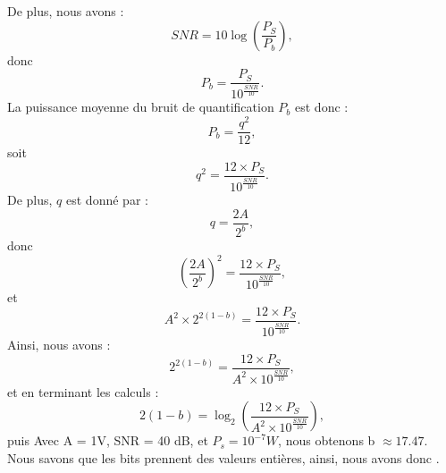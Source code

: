 De plus, nous avons :
\begin{equation}
SNR = 10 \log \left( \frac{P_S}{P_b} \right),
\end{equation}
donc
\begin{equation}
P_b = \frac{P_S}{10^{\frac{SNR}{10}}}.
\end{equation}
La puissance moyenne du bruit de quantification \( P_b \) est donc :
\begin{equation}
P_b = \frac{q^2}{12},
\end{equation}
soit
\begin{equation}
q^2 = \frac{12 \times P_S}{10^{\frac{SNR}{10}}}.
\end{equation}
De plus, \( q \) est donné par :
\begin{equation}
q = \frac{2A}{2^b},
\end{equation}
donc
\begin{equation}
\left( \frac{2A}{2^b} \right)^2 = \frac{12 \times P_S}{10^{\frac{SNR}{10}}},
\end{equation}
et
\begin{equation}
A^2 \times 2^{2(1-b)} = \frac{12 \times P_S}{10^{\frac{SNR}{10}}}.
\end{equation}
Ainsi, nous avons :
\begin{equation}
2^{2(1-b)} = \frac{12 \times P_S}{A^2 \times 10^{\frac{SNR}{10}}},
\end{equation}
et en terminant les calculs :
\begin{equation}
2(1-b) = \log_2 \left( \frac{12 \times P_S}{A^2 \times 10^{\frac{SNR}{10}}} \right),
\end{equation}
puis
Avec A = 1V, SNR = 40 dB, et $P_s = 10 ^{-7} W$, nous obtenons b $\approx 17.47.$
\\
Nous savons que les bits prennent des valeurs entières, ainsi, nous avons donc .

